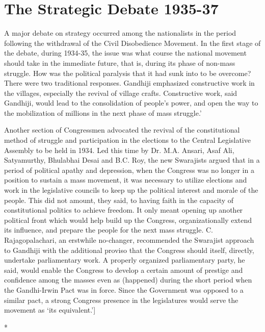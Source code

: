 
\chapter{The Strategic Debate 1935-37}



A major debate on strategy occurred among the nationalists in the period following the withdrawal of the Civil Disobedience Movement. In the first stage of the debate, during 1934-35, the issue was what course the national movement should take in the immediate future, that is, during its phase of non-mass struggle. How was the political paralysis that it had sunk into to be overcome? There were two traditional responses. Gandhiji emphasized constructive work in the villages, especially the revival of village crafts. Constructive work, said Gandhiji, would lead to the consolidation of people's power, and open the way to the mobilization of millions in the next phase of mass struggle.' 

Another section of Congressmen advocated the revival of the constitutional method of struggle and participation in the elections to the Central Legislative Assembly to be held in 1934. Led this time by Dr. M.A. Ansari, Asaf Ali, Satyamurthy, Bhulabhai Desai and B.C. Roy, the new Swarajists argued that in a period of political apathy and depression, when the Congress was no longer in a position to sustain a mass movement, it was necessary to utilize elections and work in the legislative councils to keep up the political interest and morale of the people. This did not amount, they said, to having faith in the capacity of constitutional politics to achieve freedom. It only meant opening up another political front which would help build up the Congress, organizationally extend its influence, and prepare the people for the next mass struggle. C. Rajagopalachari, an erstwhile no-changer, recommended the Swarajist approach to Gandhiji with the additional proviso that the Congress should itself, directly, undertake parliamentary work. A properly organized parliamentary party, he said, would enable the Congress to develop a certain amount of prestige and confidence among the masses even as (happened) during the short period when the Gandhi-Irwin Pact was in force. Since the Government was opposed to a similar pact, a strong Congress presence in the legislatures would serve the movement as `its equivalent.']

\begin{center}*\end{center}

